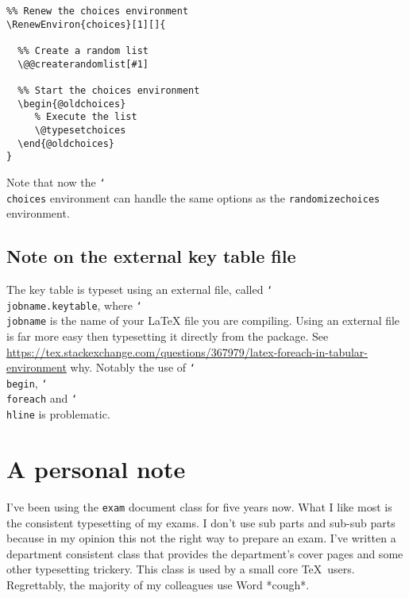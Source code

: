 \documentclass[12pt,a4paper]{exam}
\providecommand{\texorpdfstring}[2]{#1}
\newcommand{\bs}{\texorpdfstring{\char`\\}{}}
\begin{document}
\begin{lstlisting}
%% Renew the choices environment
\RenewEnviron{choices}[1][]{

  %% Create a random list
  \@@createrandomlist[#1]

  %% Start the choices environment
  \begin{@oldchoices}
     % Execute the list
     \@typesetchoices
  \end{@oldchoices}
}
\end{lstlisting}

Note that now the \texttt{\bs choices} environment can handle the same options as the
\texttt{randomizechoices} environment.

\subsection{Note on the external key table file}
The key table is typeset using an external file, called \texttt{\bs jobname.keytable},
where \texttt{\bs jobname} is the name of your \LaTeX{} file you are compiling. Using
an external file is far more easy then typesetting it directly from the package. See
\url{https://tex.stackexchange.com/questions/367979/latex-foreach-in-tabular-environment}
why. Notably the use of \texttt{\bs begin}, \texttt{\bs foreach} and \texttt{\bs hline}
is problematic.


\section{A personal note}
I've been using the \texttt{exam} document class for five years now. What I like most
is the consistent typesetting of my exams. I don't use sub parts and sub-sub parts
because in my opinion this not the right way to prepare an exam. I've written a
department consistent class that provides the department's cover pages and some
other typesetting trickery. This class is used by a small core \TeX\ users. Regrettably,
the majority of my colleagues use Word *cough*.
\end{document}
